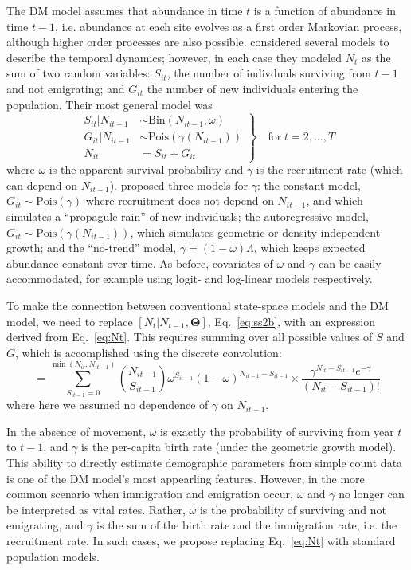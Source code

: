 \documentclass[12pt]{article}
\begin{document}
The DM model assumes that abundance in time $t$ is a function of
abundance in time $t-1$, i.e. abundance at each site evolves as a
first order Markovian process, although higher order processes are also possible.
\citet{dail_madsen:2011} considered several models to describe the temporal dynamics;
however, in each case they modeled $N_t$ as the sum of two random variables:
$S_{it}$, the number of indivduals surviving from $t-1$ and not
emigrating; and $G_{it}$ the number of new individuals entering
the population. Their most general model was
\begin{equation}
\left.\begin{aligned}
S_{it}|N_{it-1} &\sim \mathrm{Bin}(N_{it-1}, \omega) \\
G_{it}|N_{it-1} &\sim \mathrm{Pois}(\gamma(N_{it-1})) \\
N_{it} &= S_{it}+G_{it}
\end{aligned}\right\} \quad \text{for} \; t=2,\hdots,T
\label{eq:Nt}
\end{equation}
where $\omega$ is the apparent survival probability and $\gamma$
is the recruitment rate (which can depend on $N_{it-1}$).
\citet{dail_madsen:2011} proposed three
models for $\gamma$: the constant model,
$G_{it} \sim \mathrm{Pois}(\gamma)$ where recruitment does not
depend on $N_{it-1}$, and which simulates a ``propagule rain'' of new
individuals; the autoregressive model, $G_{it} \sim
\mathrm{Pois}(\gamma(N_{it-1}))$, which
simulates geometric or density independent growth; and the
``no-trend'' model, $\gamma = (1-\omega)\Lambda$, which keeps
expected abundance constant over time. As before, covariates of
$\omega$ and $\gamma$ can be easily accommodated, for example
using logit- and log-linear models respectively.

To make the connection between conventional state-space models
and the DM model, we need to replace $[N_t|N_{t-1}, \bm{\Theta}]$,
Eq.~\ref{eq:ss2b}, with an expression derived from
Eq.~\ref{eq:Nt}. This requires summing over all possible values
of $S$ and $G$, which is accomplished using the discrete convolution:
\begin{equation}
[N_{it}|N_{it-1}, \omega, \gamma] =
  \sum_{S_{it-1}=0}^{\min(N_{it},N_{it-1})}
\binom{N_{it-1}}{S_{it-1}}\omega^{S_{it-1}}(1-\omega)^{N_{it-1}-S_{it-1}}
\times
\frac{\gamma^{N_{it}-S_{it-1}}e^{-\gamma}}{(N_{it}-S_{it-1})!}  \label{eq:P}
\end{equation}
where here we assumed no dependence of $\gamma$ on $N_{it-1}$.

In the absence of movement, $\omega$ is exactly the probability of surviving
from year $t$ to $t-1$, and $\gamma$ is the per-capita birth rate
(under the geometric growth model). This ability to directly estimate
demographic parameters from simple count data is one of the DM
model's most appearling features. However,
in the more common scenario when immigration and emigration
occur, $\omega$ and $\gamma$ no longer can be interpreted as vital
rates. Rather, $\omega$ is the probability of surviving and not
emigrating, and $\gamma$ is the sum of the birth rate and the immigration rate,
i.e. the recruitment rate. In such cases, we propose
replacing Eq.~\ref{eq:Nt} with standard population models.
\end{document}
